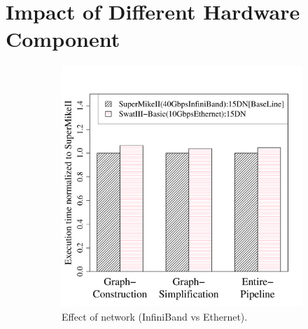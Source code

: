 \documentclass[10pt, conference, compsocconf]{IEEEtran}
\begin{document}
\section {Impact of Different Hardware Component} \label{IndividualImpactofDifferentHardwareConfiguration}
\begin{figure}[htb]
	\begin{subfigure}[b]{0.23\textwidth}
                \includegraphics[width=\textwidth]{Figure/PerormanceData/Plots/Network.pdf}
                \caption{Effect of network (InfiniBand vs Ethernet).}
                \label{fig:SuperMikeSwatBasic}
        \end{subfigure}
 	\begin{subfigure}[b]{0.23\textwidth}

\end{subfigure}
\end{figure}
\end{document}
